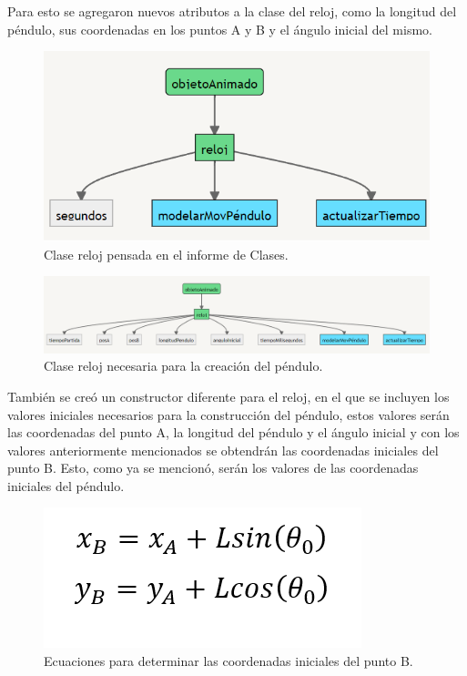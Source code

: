 \documentclass{article}
\begin{document}
Para esto se agregaron nuevos atributos a la clase del reloj, como la longitud del péndulo, sus coordenadas en los puntos A y B y el ángulo inicial del mismo.

\begin{figure}[h]
\includegraphics[scale=0.6]{Images/reloj.png}
\centering
\caption{Clase reloj pensada en el informe de Clases.}
\label{fig:reloj}
\end{figure}

\begin{figure}[h]
\includegraphics[scale=0.6]{Images/newreloj.png}
\centering
\caption{Clase reloj necesaria para la creación del péndulo.}
\label{fig:newreloj}
\end{figure}

También se creó un constructor diferente para el reloj, en el que se incluyen los valores iniciales necesarios para la construcción del péndulo, estos valores serán las coordenadas del punto A, la longitud del péndulo y el ángulo inicial y con los valores anteriormente mencionados se obtendrán las coordenadas iniciales del punto B. Esto, como ya se mencionó, serán los valores de las coordenadas iniciales del péndulo.

\newpage
\begin{figure}[h]
\includegraphics[scale=0.6]{Images/ecuacion1.png}
\centering
\caption{Ecuaciones para determinar las coordenadas iniciales del punto B.}
\label{fig:ecu2}
\end{figure}
\end{document}
